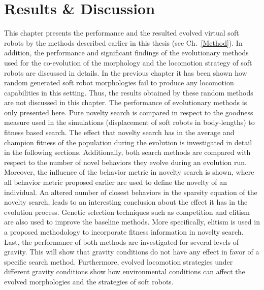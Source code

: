 
\chapter{Results \& Discussion} %

\label{Results} %


This chapter presents the performance and the resulted evolved virtual soft robots by the methods described earlier in this thesis (see Ch.~\ref{Method}). In addition, the performance and significant findings of the evolutionary methods used for the co-evolution of the morphology and the locomotion strategy of soft robots are discussed in details. In the previous chapter it has been shown how random generated soft robot morphologies fail to produce any locomotion capabilities in this setting. Thus, the results obtained by these random methods are not discussed in this chapter. The performance of evolutionary methods is only presented here. Pure novelty search is compared in respect to the goodness measure used in the simulations (displacement of soft robots in body-lengths) to fitness based search. The effect that novelty search has in the average and champion fitness of the population during the evolution is investigated in detail in the following sections. Additionally, both search methods are compared with respect to the number of novel behaviors they evolve during an evolution run. Moreover, the influence of the behavior metric in novelty search is shown, where all behavior metric proposed earlier are used to define the novelty of an individual. An altered number of closest behaviors in the sparsity equation of the novelty search, leads to an interesting conclusion about the effect it has in the evolution process. Genetic selection techniques such as competition and elitism are also used to improve the baseline methods. More specifically, elitism is used in a proposed methodology to incorporate fitness information in novelty search. Last, the performance of both methods are investigated for several levels of gravity. This will show that gravity conditions do not have any effect in favor of a specific search method. Furthermore, evolved locomotion strategies under different gravity conditions show how environmental conditions can affect the evolved morphologies and the strategies of soft robots. 

